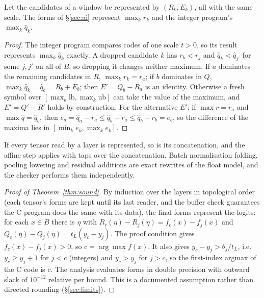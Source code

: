 \begin{lemma}
Let the candidates of a window be represented by $(R_k,E_k)$, all with the same scale. The forms of \S\ref{sec:ai} represent $\max_k r_k$ and the integer program's $\max_k \hat q_k$.
\end{lemma}
\begin{proof}
The integer program compares codes of one scale $t>0$, so its result represents $\max_k \hat q_k$ exactly. A dropped candidate $k$ has $r_k<r_j$ and $\hat q_k<\hat q_{j'}$ for some $j,j'$ on all of $B$, so dropping it changes neither maximum. If $a$ dominates the remaining candidates in $R$, $\max_k r_k=r_a$; if $b$ dominates in $Q$, $\max_k\hat q_k=\hat q_b=R_b+E_b$; then $E'=Q_b-R_a$ is an identity. Otherwise a fresh symbol over $[\max_k\mathrm{lb},\max_k\mathrm{ub}]$ can take the value of the maximum, and $E'=Q'-R'$ holds by construction. For the alternative $E'$: if $\max r=r_a$ and $\max\hat q=\hat q_b$, then $e_a=\hat q_a-r_a\le \hat q_b-r_a\le \hat q_b-r_b=e_b$, so the difference of the maxima lies in $[\min_k e_k,\max_k e_k]$.
\end{proof}

\begin{lemma}[Graph]
If every tensor read by a layer is represented, so is its concatenation, and the affine step applies with taps over the concatenation. Batch normalisation folding, pooling lowering and residual additions are exact rewrites of the float model, and the checker performs them independently.
\end{lemma}

\begin{proof}[Proof of Theorem~\ref{thm:sound}]
By induction over the layers in topological order (each tensor's forms are kept until its last reader, and the buffer check guarantees the C program does the same with its data), the final forms represent the logits: for each $x\in B$ there is $\eta$ with $R_c(\eta)-R_j(\eta)=f_c(x)-f_j(x)$ and $Q_c(\eta)-Q_j(\eta)=t_L(y_c-y_j)$. The proof condition gives $f_c(x)-f_j(x)>0$, so $c=\arg\max f(x)$. It also gives $y_c-y_j>\theta_j/t_L$, i.e.\ $y_c\ge y_j+1$ for $j<c$ (integers) and $y_c>y_j$ for $j>c$, so the first-index argmax of the C code is $c$. The analysis evaluates forms in double precision with outward slack of $10^{-12}$ relative per bound. This is a documented assumption rather than directed rounding (\S\ref{sec:limits}).
\end{proof}
